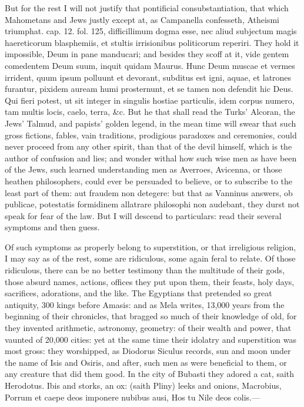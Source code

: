 {But for the rest I will not justify that pontificial consubstantiation,
that which Mahometans and Jews justly except at, as Campanella
confesseth, Atheismi triumphat. cap. 12. fol. 125, difficillimum dogma
esse, nec aliud subjectum magis haereticorum blasphemiis, et stultis
irrisionibus politicorum reperiri. They hold it impossible, Deum in
pane manducari; and besides they scoff at it, vide gentem comedentem
Deum suum, inquit quidam Maurus. Hunc Deum muscae et vermes
irrident, quum ipsum polluunt et devorant, subditus est igni, aquae, et
latrones furantur, pixidem auream humi prosternunt, et se tamen non
defendit hic Deus. Qui fieri potest, ut sit integer in singulis hostiae
particulis, idem corpus numero, tam multis locis, caelo, terra, \&c. But
he that shall read the Turks' Alcoran, the Jews' Talmud, and
papists' golden legend, in the mean time will swear that such gross
fictions, fables, vain traditions, prodigious paradoxes and ceremonies,
could never proceed from any other spirit, than that of the devil
himself, which is the author of confusion and lies; and wonder withal
how such wise men as have been of the Jews, such learned understanding
men as Averroes, Avicenna, or those heathen philosophers, could ever be
persuaded to believe, or to subscribe to the least part of them: aut
fraudem non detegere: but that as Vanninus answers, ob publicae,
potestatis formidinem allatrare philosophi non audebant, they durst not
speak for fear of the law. But I will descend to particulars: read
their several symptoms and then guess.

Of such symptoms as properly belong to superstition, or that
irreligious religion, I may say as of the rest, some are ridiculous,
some again feral to relate. Of those ridiculous, there can be no better
testimony than the multitude of their gods, those absurd names,
actions, offices they put upon them, their feasts, holy days,
sacrifices, adorations, and the like. The Egyptians that pretended so
great antiquity, 300 kings before Amasis: and as Mela writes, 13,000
years from the beginning of their chronicles, that bragged so much of
their knowledge of old, for they invented arithmetic, astronomy,
geometry: of their wealth and power, that vaunted of 20,000 cities: yet
at the same time their idolatry and superstition was most gross: they
worshipped, as Diodorus Siculus records, sun and moon under the name of
Isis and Osiris, and after, such men as were beneficial to them, or any
creature that did them good. In the city of Bubasti they adored a cat,
saith Herodotus. Ibis and storks, an ox: (saith Pliny) leeks and
onions, Macrobius,
Porrum et caepe deos imponere nubibus ausi,
Hos tu Nile deos colis.---

}
